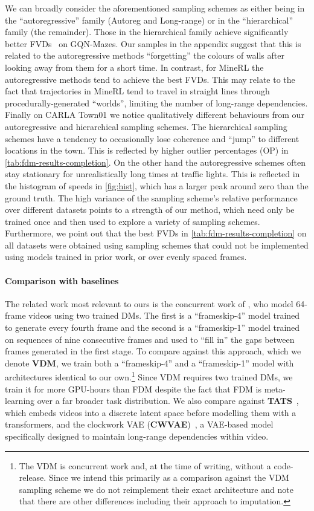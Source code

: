 We can broadly consider the aforementioned sampling schemes as either being in the ``autoregressive'' family (Autoreg and Long-range) or in the ``hierarchical'' family (the remainder). Those in the hierarchical family achieve significantly better FVDs~\cite{unterthiner2018towards} on GQN-Mazes. Our samples in the appendix suggest that this is related to the autoregressive methods ``forgetting'' the colours of walls after looking away from them for a short time. In contrast, for MineRL the autoregressive methods tend to achieve the best FVDs. This may relate to the fact that trajectories in MineRL tend to travel in straight lines through procedurally-generated ``worlds''\cite{guss2019minerl,saxena2021clockwork}, limiting the number of long-range dependencies. 
Finally on CARLA Town01 we notice qualitatively different behaviours from our autoregressive and hierarchical sampling schemes. The hierarchical
sampling schemes have a tendency to occasionally lose coherence and ``jump'' 
to different locations in the town. This is reflected by higher outlier percentages (OP) in \cref{tab:fdm-results-completion}. On the other hand the autoregressive schemes often stay stationary for unrealistically long times at traffic lights. This is reflected in the histogram of speeds in \cref{fig:hist}, which has a larger peak around zero than the ground truth. The high variance of the sampling scheme's relative performance over different datasets points to a strength of our method, which need only be trained once and then used to explore a variety of sampling schemes. Furthermore, we point out that the best FVDs in \cref{tab:fdm-results-completion} on all datasets were obtained using sampling schemes that could not be implemented using models trained in prior work, or over evenly spaced frames.

\paragraph{Comparison with baselines}
The related work most relevant to ours is the concurrent work of \citet{ho2022video}, who model 64-frame videos using two trained DMs. The first is a ``frameskip-4'' model trained to generate every fourth frame and the second is a ``frameskip-1'' model trained on sequences of nine consecutive frames and used to ``fill in'' the gaps between frames generated in the first stage. To compare against this approach, which we denote \textbf{VDM}, we train both a ``frameskip-4'' and a ``frameskip-1'' model with architectures identical to our own.\footnote{The VDM is concurrent work and, at the time of writing, without a code-release. Since we intend this primarily as a comparison against the VDM sampling scheme we do not reimplement their exact architecture and note that there are other differences including their approach to imputation.} Since VDM requires two trained DMs, we train it for more GPU-hours than FDM despite the fact that FDM is meta-learning over a far broader task distribution. We also compare against \textbf{TATS}~\citep{ge2022long}, which embeds videos into a discrete latent space before modelling them with a transformers, and the clockwork VAE (\textbf{CWVAE})~\citep{saxena2021clockwork}, a VAE-based model specifically designed to maintain long-range dependencies within video.

